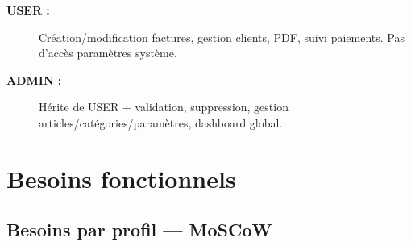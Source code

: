\begin{description}
    \item[\textbf{USER :}] Création/modification factures, gestion clients, PDF, suivi paiements. Pas d'accès paramètres système.
    \item[\textbf{ADMIN :}] Hérite de USER + validation, suppression, gestion articles/catégories/paramètres, dashboard global.
\end{description}

\section{Besoins fonctionnels}

\subsection{Besoins par profil — MoSCoW}

